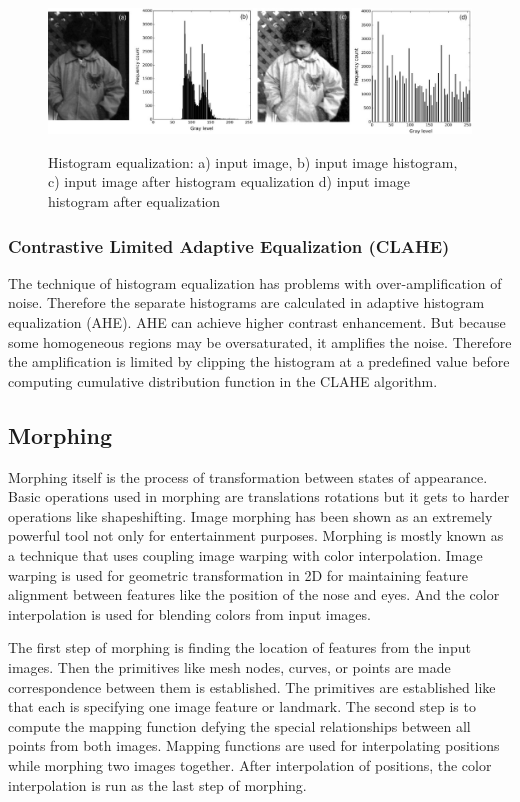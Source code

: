 \begin{figure}[H]
    \centering
        {\includegraphics[width=0.8\linewidth]{obrazky-figures/histogram.png}}\\
        \caption{Histogram equalization: a) input image, b) input image histogram, c) input image after histogram equalization d) input image histogram after equalization \cite{histogram}}
        \label{fig:histogram_eq}
\end{figure}

\subsubsection{Contrastive Limited Adaptive Equalization (CLAHE)}
The technique of histogram equalization has problems with over-amplification of noise. Therefore the separate histograms are calculated in adaptive histogram equalization (AHE). AHE can achieve higher contrast enhancement. But because some homogeneous regions may be oversaturated, it amplifies the noise. Therefore the amplification is limited by clipping the histogram at a predefined value before computing cumulative distribution function in the CLAHE algorithm. \cite{histogram}

\subsection{Morphing}
Morphing itself is the process of transformation between states of appearance. Basic operations used in morphing are translations rotations but it gets to harder operations like shapeshifting. \cite{morphing3} Image morphing has been shown as an extremely powerful tool not only for entertainment purposes. Morphing is mostly known as a technique that uses coupling image warping with color interpolation. Image warping is used for geometric transformation in 2D for maintaining feature alignment between features like the position of the nose and eyes. And the color interpolation is used for blending colors from input images. \cite{morphing2} \cite{morphing1}

The first step of morphing is finding the location of features from the input images. Then the primitives like mesh nodes, curves, or points are made correspondence between them is established. The primitives are established like that each is specifying one image feature or landmark. The second step is to compute the mapping function defying the special relationships between all points from both images. Mapping functions are used for interpolating positions while morphing two images together. After interpolation of positions, the color interpolation is run as the last step of morphing. \cite{morphing1}

